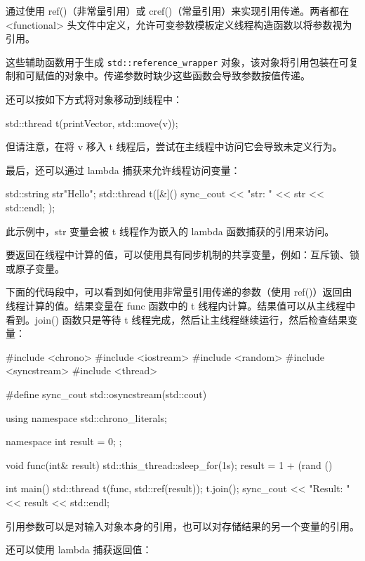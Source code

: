 通过使用 ref()（非常量引用）或 cref()（常量引用）来实现引用传递。两者都在 <functional> 头文件中定义，允许可变参数模板定义线程构造函数以将参数视为引用。

这些辅助函数用于生成 \verb|std::reference_wrapper| 对象，该对象将引用包装在可复制和可赋值的对象中。传递参数时缺少这些函数会导致参数按值传递。

还可以按如下方式将对象移动到线程中：

\begin{cpp}
std::thread t(printVector, std::move(v));
\end{cpp}

但请注意，在将 v 移入 t 线程后，尝试在主线程中访问它会导致未定义行为。

最后，还可以通过 lambda 捕获来允许线程访问变量：

\begin{cpp}
std::string str{"Hello"};
std::thread t([&]() {
    sync_cout << "str: " << str << std::endl;
});
\end{cpp}

此示例中，str 变量会被 t 线程作为嵌入的 lambda 函数捕获的引用来访问。


要返回在线程中计算的值，可以使用具有同步机制的共享变量，例如：互斥锁、锁或原子变量。

下面的代码段中，可以看到如何使用非常量引用传递的参数（使用 ref()）返回由线程计算的值。结果变量在 func 函数中的 t 线程内计算。结果值可以从主线程中看到。join() 函数只是等待 t 线程完成，然后让主线程继续运行，然后检查结果变量：

\begin{cpp}
#include <chrono>
#include <iostream>
#include <random>
#include <syncstream>
#include <thread>

#define sync_cout std::osyncstream(std::cout)

using namespace std::chrono_literals;

namespace {
    int result = 0;
};

void func(int& result) {
    std::this_thread::sleep_for(1s);
    result = 1 + (rand () %
}

int main() {
    std::thread t(func, std::ref(result));
    t.join();
    sync_cout << "Result: " << result << std::endl;
}
\end{cpp}

引用参数可以是对输入对象本身的引用，也可以对存储结果的另一个变量的引用。

还可以使用 lambda 捕获返回值：

